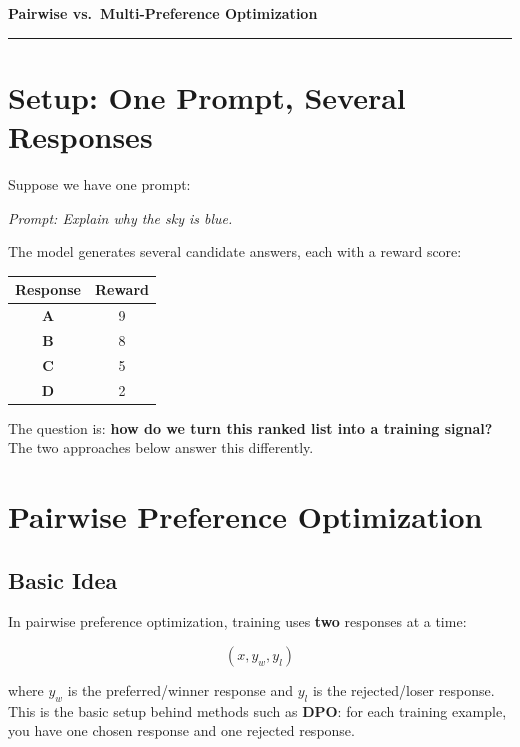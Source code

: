 \documentclass[11pt]{article}
\begin{document}
\begin{center}
  {\Huge\bfseries\color{deepblue} Pairwise vs.\ Multi-Preference Optimization}\\[4pt]
  {\color{accent}\rule{0.4\linewidth}{1pt}}
\end{center}
\vspace{8pt}

\section*{Setup: One Prompt, Several Responses}

Suppose we have one prompt:

\begin{center}
\textit{Prompt: Explain why the sky is blue.}
\end{center}

The model generates several candidate answers, each with a reward score:

\begin{center}
\renewcommand{\arraystretch}{1.3}
\begin{tabular}{>{\bfseries\color{deepblue}}c c}
\toprule
\rowcolor{soft} Response & Reward \\
\midrule
A & 9 \\
B & 8 \\
C & 5 \\
D & 2 \\
\bottomrule
\end{tabular}
\end{center}

The question is: \textbf{how do we turn this ranked list into a training signal?} The two approaches below answer this differently.

\section*{Pairwise Preference Optimization}

\subsection*{Basic Idea}

In pairwise preference optimization, training uses \textbf{two} responses at a time:

\[
(x, y_w, y_l)
\]

where $y_w$ is the preferred/winner response and $y_l$ is the rejected/loser response. This is the basic setup behind methods such as \textbf{DPO}: for each training example, you have one chosen response and one rejected response.
\end{document}
